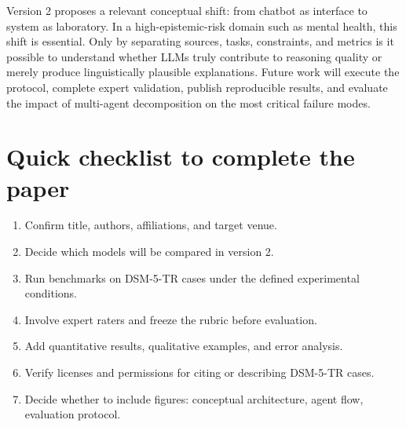 \documentclass[11pt,a4paper]{article}
\begin{document}
Version 2 proposes a relevant conceptual shift: from chatbot as interface to system as laboratory. In a high-epistemic-risk domain such as mental health, this shift is essential. Only by separating sources, tasks, constraints, and metrics is it possible to understand whether LLMs truly contribute to reasoning quality or merely produce linguistically plausible explanations. Future work will execute the protocol, complete expert validation, publish reproducible results, and evaluate the impact of multi-agent decomposition on the most critical failure modes.

\section*{Quick checklist to complete the paper}
\begin{enumerate}
  \item Confirm title, authors, affiliations, and target venue.
  \item Decide which models will be compared in version 2.
  \item Run benchmarks on DSM-5-TR cases under the defined experimental conditions.
  \item Involve expert raters and freeze the rubric before evaluation.
  \item Add quantitative results, qualitative examples, and error analysis.
  \item Verify licenses and permissions for citing or describing DSM-5-TR cases.
  \item Decide whether to include figures: conceptual architecture, agent flow, evaluation protocol.
\end{enumerate}



\end{document}
